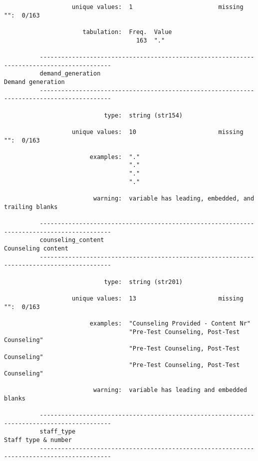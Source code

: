 \documentclass{article}
\begin{document}
\begin{verbatim}
                   unique values:  1                        missing "":  0/163
          
                      tabulation:  Freq.  Value
                                     163  "."
          
          ------------------------------------------------------------------------------------------
          demand_generation                                                        Demand generation
          ------------------------------------------------------------------------------------------
          
                            type:  string (str154)
          
                   unique values:  10                       missing "":  0/163
          
                        examples:  "."
                                   "."
                                   "."
                                   "."
          
                         warning:  variable has leading, embedded, and trailing blanks
          
          ------------------------------------------------------------------------------------------
          counseling_content                                                      Counseling content
          ------------------------------------------------------------------------------------------
          
                            type:  string (str201)
          
                   unique values:  13                       missing "":  0/163
          
                        examples:  "Counseling Provided - Content Nr"
                                   "Pre-Test Counseling, Post-Test Counseling"
                                   "Pre-Test Counseling, Post-Test Counseling"
                                   "Pre-Test Counseling, Post-Test Counseling"
          
                         warning:  variable has leading and embedded blanks
          
          ------------------------------------------------------------------------------------------
          staff_type                                                             Staff type & number
          ------------------------------------------------------------------------------------------
          

\end{verbatim}
\end{document}
